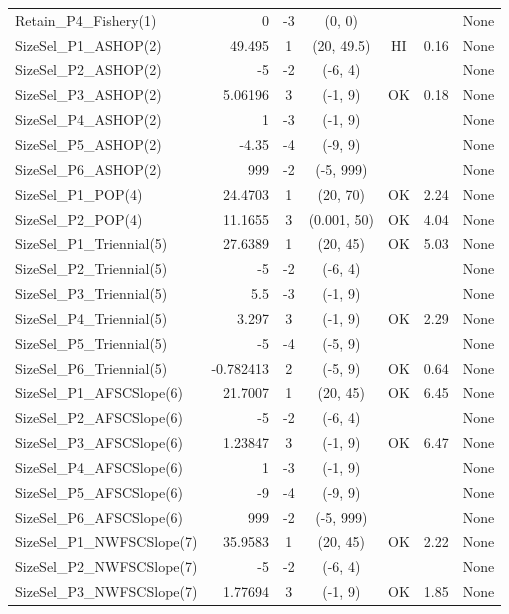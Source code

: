 \documentclass[12pt,]{article}
\begin{document}
\begin{landscape}
\begin{longtable}{lrcccll}
  Retain\_P4\_Fishery(1) & 0 & -3 & (0, 0) &  &  & None \\ 
  SizeSel\_P1\_ASHOP(2) & 49.495 & 1 & (20, 49.5) & HI & 0.16 & None \\ 
  SizeSel\_P2\_ASHOP(2) & -5 & -2 & (-6, 4) &  &  & None \\ 
  SizeSel\_P3\_ASHOP(2) & 5.06196 & 3 & (-1, 9) & OK & 0.18 & None \\ 
  SizeSel\_P4\_ASHOP(2) & 1 & -3 & (-1, 9) &  &  & None \\ 
  SizeSel\_P5\_ASHOP(2) & -4.35 & -4 & (-9, 9) &  &  & None \\ 
  SizeSel\_P6\_ASHOP(2) & 999 & -2 & (-5, 999) &  &  & None \\ 
  SizeSel\_P1\_POP(4) & 24.4703 & 1 & (20, 70) & OK & 2.24 & None \\ 
  SizeSel\_P2\_POP(4) & 11.1655 & 3 & (0.001, 50) & OK & 4.04 & None \\ 
  SizeSel\_P1\_Triennial(5) & 27.6389 & 1 & (20, 45) & OK & 5.03 & None \\ 
  SizeSel\_P2\_Triennial(5) & -5 & -2 & (-6, 4) &  &  & None \\ 
  SizeSel\_P3\_Triennial(5) & 5.5 & -3 & (-1, 9) &  &  & None \\ 
  SizeSel\_P4\_Triennial(5) & 3.297 & 3 & (-1, 9) & OK & 2.29 & None \\ 
  SizeSel\_P5\_Triennial(5) & -5 & -4 & (-5, 9) &  &  & None \\ 
  SizeSel\_P6\_Triennial(5) & -0.782413 & 2 & (-5, 9) & OK & 0.64 & None \\ 
  SizeSel\_P1\_AFSCSlope(6) & 21.7007 & 1 & (20, 45) & OK & 6.45 & None \\ 
  SizeSel\_P2\_AFSCSlope(6) & -5 & -2 & (-6, 4) &  &  & None \\ 
  SizeSel\_P3\_AFSCSlope(6) & 1.23847 & 3 & (-1, 9) & OK & 6.47 & None \\ 
  SizeSel\_P4\_AFSCSlope(6) & 1 & -3 & (-1, 9) &  &  & None \\ 
  SizeSel\_P5\_AFSCSlope(6) & -9 & -4 & (-9, 9) &  &  & None \\ 
  SizeSel\_P6\_AFSCSlope(6) & 999 & -2 & (-5, 999) &  &  & None \\ 
  SizeSel\_P1\_NWFSCSlope(7) & 35.9583 & 1 & (20, 45) & OK & 2.22 & None \\ 
  SizeSel\_P2\_NWFSCSlope(7) & -5 & -2 & (-6, 4) &  &  & None \\ 
  SizeSel\_P3\_NWFSCSlope(7) & 1.77694 & 3 & (-1, 9) & OK & 1.85 & None \\ 

\end{longtable}
\end{landscape}
\end{document}
